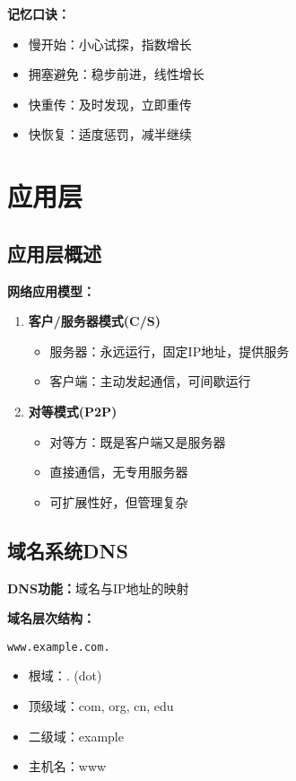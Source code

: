 \documentclass[lang=cn,newtx,10pt,scheme=chinese]{../../elegantbook}
\begin{document}
\textbf{记忆口诀：}
\begin{itemize}
  \item 慢开始：小心试探，指数增长
  \item 拥塞避免：稳步前进，线性增长  
  \item 快重传：及时发现，立即重传
  \item 快恢复：适度惩罚，减半继续
\end{itemize}

\chapter{应用层}

\section{应用层概述}

\textbf{网络应用模型：}
\begin{enumerate}
  \item \textbf{客户/服务器模式(C/S)}
    \begin{itemize}
      \item 服务器：永远运行，固定IP地址，提供服务
      \item 客户端：主动发起通信，可间歇运行
    \end{itemize}
  
  \item \textbf{对等模式(P2P)}
    \begin{itemize}
      \item 对等方：既是客户端又是服务器
      \item 直接通信，无专用服务器
      \item 可扩展性好，但管理复杂
    \end{itemize}
\end{enumerate}

\section{域名系统DNS}

\textbf{DNS功能：}域名与IP地址的映射

\textbf{域名层次结构：}
\begin{center}
\texttt{www.example.com.}
\end{center}
\begin{itemize}
  \item 根域：. (dot)
  \item 顶级域：com, org, cn, edu
  \item 二级域：example
  \item 主机名：www
\end{itemize}
\end{document}
